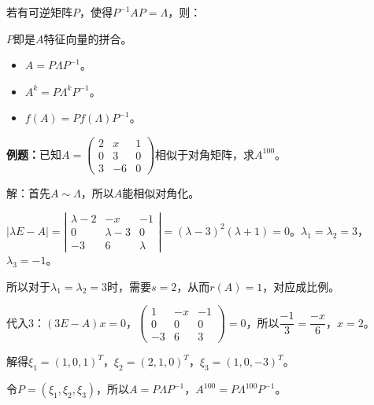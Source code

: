 若有可逆矩阵$P$，使得$P^{-1}AP=\Lambda$，则：

$P$即是$A$特征向量的拼合。

\begin{itemize}
    \item $A=P\Lambda P^{-1}$。
    \item $A^k=P\Lambda^kP^{-1}$。
    \item $f(A)=Pf(\Lambda)P^{-1}$。
\end{itemize}

\textbf{例题：}已知$A=\left(\begin{array}{ccc}
    2 & x & 1 \\
    0 & 3 & 0 \\
    3 & -6 & 0
\end{array}\right)$相似于对角矩阵，求$A^{100}$。\medskip

解：首先$A\sim\Lambda$，所以$A$能相似对角化。

$\vert\lambda E-A\vert=\left|\begin{array}{ccc}
    \lambda-2 & -x & -1 \\
    0 & \lambda-3 & 0 \\
    -3 & 6 & \lambda
\end{array}\right|=(\lambda-3)^2(\lambda+1)=0$。$\lambda_1=\lambda_2=3$，$\lambda_3=-1$。

所以对于$\lambda_1=\lambda_2=3$时，需要$s=2$，从而$r(A)=1$，对应成比例。

代入3：$(3E-A)x=0$，$\left(\begin{array}{ccc}
    1 & -x & -1 \\
    0 & 0 & 0 \\
    -3 & 6 & 3
\end{array}\right)=0$，所以$\dfrac{-1}{3}=\dfrac{-x}{6}$，$x=2$。

解得$\xi_1=(1,0,1)^T$，$\xi_2=(2,1,0)^T$，$\xi_3=(1,0,-3)^T$。

令$P=(\xi_1,\xi_2,\xi_3)$，所以$A=P\Lambda P^{-1}$，$A^{100}=P\Lambda^{100}P^{-1}$。

%
